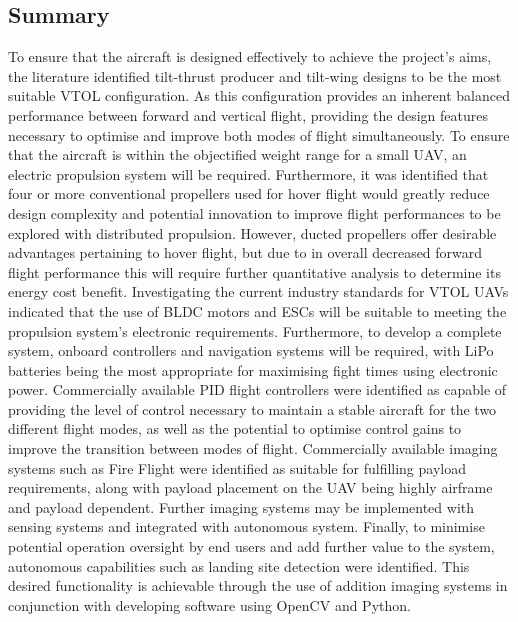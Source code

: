 \subsection{Summary}
To ensure that the aircraft is designed effectively to achieve the project's aims, the literature identified tilt-thrust producer and tilt-wing designs to be the most suitable VTOL configuration. As this configuration provides an inherent balanced performance between forward and vertical flight, providing the design features necessary to optimise and improve both modes of flight simultaneously. To ensure that the aircraft is within the objectified weight range for a small UAV, an electric propulsion system will be required. Furthermore, it was identified that four or more conventional propellers used for hover flight would greatly reduce design complexity and potential innovation to improve flight performances to be explored with distributed propulsion. However, ducted propellers offer desirable advantages pertaining to hover flight, but due to in overall decreased forward flight performance this will require further quantitative analysis to determine its energy cost benefit. Investigating the current industry standards for VTOL UAVs indicated that the use of BLDC motors and ESCs will be suitable to meeting the propulsion system's electronic requirements. Furthermore, to develop a complete system, onboard controllers and navigation systems will be required, with LiPo batteries being the most appropriate for maximising fight times using electronic power. Commercially available PID flight controllers were identified as capable of providing the level of control necessary to maintain a stable aircraft for the two different flight modes, as well as the potential to optimise control gains to improve the transition between modes of flight. Commercially available imaging systems such as Fire Flight were identified as suitable for fulfilling payload requirements, along with payload placement on the UAV being highly airframe and payload dependent. Further imaging systems may be implemented with sensing systems and integrated with autonomous system. Finally, to minimise potential operation oversight by end users and add further value to the system, autonomous capabilities such as landing site detection were identified. This desired functionality is achievable through the use of addition imaging systems in conjunction with developing software using OpenCV and Python. 



